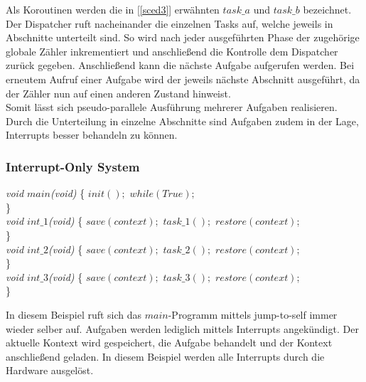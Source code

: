 Als Koroutinen werden die in [\ref{sced3}] erwähnten $task\_a$ und $task\_b$ bezeichnet. Der Dispatcher ruft nacheinander die einzelnen Tasks auf, welche jeweils in Abschnitte unterteilt sind. So wird nach jeder ausgeführten Phase der zugehörige globale Zähler inkrementiert und anschließend die Kontrolle dem Dispatcher zurück gegeben. Anschließend kann die nächste Aufgabe aufgerufen werden. Bei erneutem Aufruf einer Aufgabe wird der jeweils nächste Abschnitt ausgeführt, da der Zähler nun auf einen anderen Zustand hinweist.\\
Somit lässt sich pseudo-parallele Ausführung mehrerer Aufgaben realisieren. Durch die Unterteilung in einzelne Abschnitte sind Aufgaben zudem in der Lage, Interrupts besser behandeln zu können.

\subsubsection{Interrupt-Only System}
\begin{algorithm}
\label{sced4}
\begin{algorithmic}[1]

\BState \textit{void $main$(void)}
\{
\State $init();$
\State $while(True);$\\
\}\\

\BState \textit{void $int\_1$(void)}
\{
\State $save(context);$
\State $task\_1();$
\State $restore(context)$;\\
\}\\

\BState \textit{void $int\_2$(void)}
\{
\State $save(context);$
\State $task\_2();$
\State $restore(context)$;\\
\}\\

\BState \textit{void $int\_3$(void)}
\{
\State $save(context);$
\State $task\_3();$
\State $restore(context)$;\\
\}

\end{algorithmic}
\end{algorithm}
In diesem Beispiel ruft sich das $main$-Programm mittels jump-to-self immer wieder selber auf. Aufgaben werden lediglich mittels Interrupts angekündigt. Der aktuelle Kontext wird gespeichert, die Aufgabe behandelt und der Kontext anschließend geladen. In diesem Beispiel werden alle Interrupts durch die Hardware ausgelöst.\\

